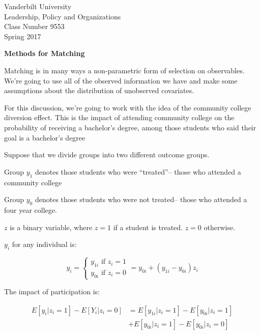 \documentclass[12pt]{article}
\begin{document}
\thispagestyle{empty}%


\setmarginsrb{1in}{.5in}{.1in}{.5in}{0pt}{0mm}{0pt}{0mm}%

\setlength{\parskip}{1ex plus 0.5ex minus 0.2ex}

\setcounter{secnumdepth}{-2}



\begin{flushleft}
Vanderbilt University\\Leadership, Policy and Organizations\\Class Number 9553\\ Spring 2017
\end{flushleft}

\begin{center}
\textbf{Methods for Matching}
\end{center}


Matching is in many ways a non-parametric form of
selection on observables. We're going to use all of the observed
information we have and make some assumptions about the distribution
of unobserved covariates. 

For this discussion, we're going to work with the idea of the
community college diversion effect. This is the impact of attending
community college on the probability of receiving a bachelor's
degree, among those students who said their goal is a bachelor's degree

Suppose that we divide groups into two different outcome groups.

Group $y_1$ denotes those students who were ``treated''-- those who
attended a community college

Group $y_0$ denotes those students who were not treated-- those who
attended a four year college. 

$z$ is a binary variable, where $z=1$ if a student is treated. 
$z=0$ otherwise. 

$y_i$ for any individual is:

\begin{equation*}
  y_i=
\begin{cases}
  y_{1i} \text{ if } z_i=1 \\
y_{0i} \text{ if } z_i=0
\end{cases}=
y_{0i}+(y_{1i}-y_{0i})z_i
\end{equation*}

The impact of participation is:
 
\begin{align*}
  E[y_i|z_i=1]-E[Y_i|z_i=0]&=E[y_{1i}|z_i=1]-E[y_{0i}|z_i=1]\\
                           &+E[y_{0i}|z_i=1]-E[y_{0i}|z_i=0]
\end{align*}
\end{document}

